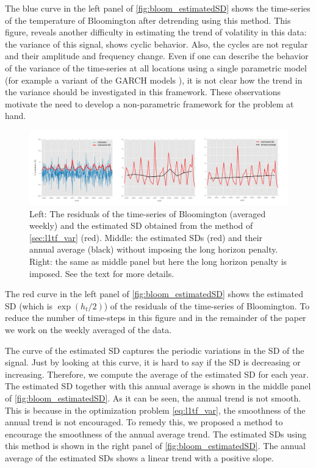 \documentclass{article}
\begin{document}
The blue curve in the left panel of \autoref{fig:bloom_estimatedSD} shows the time-series of the temperature of Bloomington after detrending using this method. This figure, reveals another difficulty in estimating the trend of volatility in this data: the variance of this signal, shows cyclic behavior. Also, the cycles are not regular and their amplitude and frequency change. Even if one can describe the behavior of the variance of the time-series at all locations using a single parametric model (for example a variant of the GARCH models \citep{bollerslev_generalized_1986}), it is not clear how the trend in the variance should be investigated in this framework. These observations motivate the need to develop a non-parametric framework for the problem at hand.

\begin{figure}[tb]
  \centering
  \includegraphics[width=\columnwidth]{Figures/bloom_estimatedSD}
  \caption{Left: The residuals of the time-series of Bloomington
    (averaged weekly) and the estimated SD obtained from the method of
    \autoref{sec:l1tf_var} (red). Middle: the estimated SDs (red) and
    their annual average (black) without imposing the long horizon
    penalty. Right: the same as middle panel but here the long horizon
    penalty is imposed. See the text for more details.} 
  \label{fig:bloom_estimatedSD}
\end{figure} 


The red curve in the left panel of \autoref{fig:bloom_estimatedSD}
shows the estimated SD (which is $\exp(h_t/2)$) of the residuals of
the time-series of Bloomington. To reduce the number of time-steps in
this figure and in the remainder of the paper we work on the weekly
averaged of the data.  

The curve of the estimated SD captures the periodic variations in the
SD of the signal. Just by looking at this curve, it is hard to say if
the SD is decreasing or increasing. Therefore, we compute the average
of the estimated SD for each year. The estimated SD together with this
annual average is shown in the middle panel of
\autoref{fig:bloom_estimatedSD}. As it can be seen, the annual trend
is not smooth. This is because in the optimization problem
\eqref{eq:l1tf_var}, the smoothness of the annual trend is not
encouraged. To remedy this, we proposed a method to encourage the smoothness of the annual average trend. The estimated SDs using this method is shown in the right panel of \autoref{fig:bloom_estimatedSD}. The annual average of the estimated SDs shows a linear trend with a positive slope. 

 


\small

\end{document}
